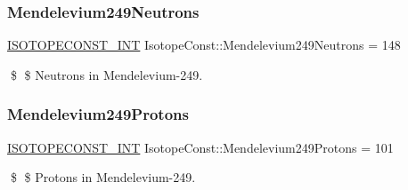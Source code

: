 \subsubsection{\texorpdfstring{Mendelevium249\+Neutrons}{Mendelevium249Neutrons}}
{\footnotesize\ttfamily \mbox{\hyperlink{group___isotope_const-_macros_ga5f18360b3e99483a35c32d789e62621c}{I\+S\+O\+T\+O\+P\+E\+C\+O\+N\+S\+T\+\_\+\+I\+NT}} Isotope\+Const\+::\+Mendelevium249\+Neutrons = 148}

\$ \$ Neutrons in Mendelevium-\/249. \mbox{\label{group___isotope_const-_mendelevium-_md249_ga7f2b29b327f9716ac608a35ae6586e08}} 
\subsubsection{\texorpdfstring{Mendelevium249\+Protons}{Mendelevium249Protons}}
{\footnotesize\ttfamily \mbox{\hyperlink{group___isotope_const-_macros_ga5f18360b3e99483a35c32d789e62621c}{I\+S\+O\+T\+O\+P\+E\+C\+O\+N\+S\+T\+\_\+\+I\+NT}} Isotope\+Const\+::\+Mendelevium249\+Protons = 101}

\$ \$ Protons in Mendelevium-\/249. 